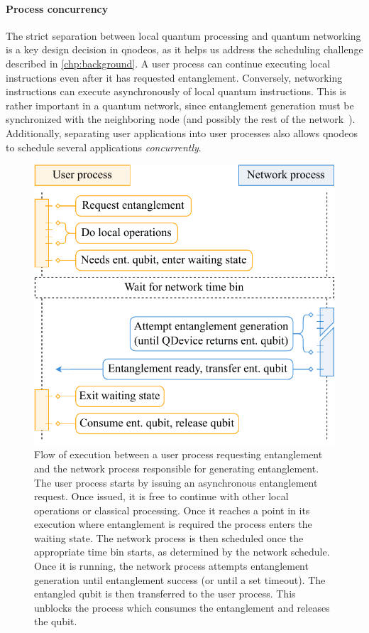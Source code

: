 \paragraph{Process concurrency}

The strict separation between local quantum processing and quantum networking is a key design
decision in \acrshort{qnodeos}, as it helps us address the scheduling challenge described in
\cref{chp:background}. A user process can continue executing local instructions even after it has
requested entanglement. Conversely, networking instructions can execute asynchronously of local
quantum instructions. This is rather important in a quantum network, since entanglement generation
must be synchronized with the neighboring node (and possibly the rest of the
network~\cite{skrzypczyk_2021_arch}). Additionally, separating user applications into user processes
also allows \acrshort{qnodeos} to schedule several applications \emph{concurrently}.

\begin{figure}[t]
    \centering
    \includegraphics[width=0.6\linewidth]{figures/process-flow.pdf}
    \caption{
        Flow of execution between a user process requesting entanglement and the network process
        responsible for generating entanglement. The user process starts by issuing an asynchronous
        entanglement request. Once issued, it is free to continue with other local operations or
        classical processing. Once it reaches a point in its execution where entanglement is
        required the process enters the waiting state. The network process is then scheduled once
        the appropriate time bin starts, as determined by the network schedule. Once it is running,
        the network process attempts entanglement generation until entanglement success (or until a
        set timeout). The entangled qubit is then transferred to the user process. This unblocks the
        process which consumes the entanglement and releases the qubit.
    }
    \label{fig:process-flow}
\end{figure}

